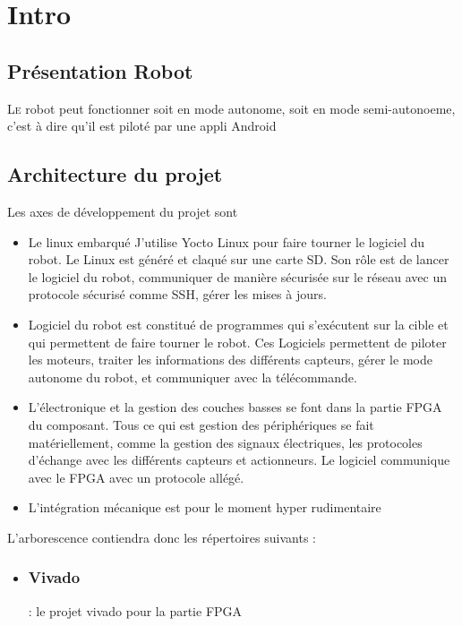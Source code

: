 
\chapter{Intro}

\section{Présentation Robot}
\lettrine[lines=1]{L}e robot peut fonctionner soit en mode autonome, soit en mode semi-autonoeme, c'est à dire qu'il est piloté par une appli Android




\section{Architecture du projet}

Les axes de développement du projet sont
\begin{itemize}
\item  Le linux embarqué
J'utilise Yocto Linux pour faire tourner le logiciel du robot. Le Linux est généré et claqué sur une carte SD.
Son rôle est de lancer le logiciel du robot, communiquer de manière sécurisée sur le réseau avec un protocole sécurisé comme SSH, gérer les mises à jours.

\item Logiciel du robot est constitué de programmes qui s'exécutent sur la cible et qui permettent de faire tourner le robot.
Ces Logiciels permettent de piloter les moteurs, traiter les informations des différents capteurs, gérer le mode autonome du robot, et communiquer avec la télécommande.
\item L'électronique et la gestion des couches basses se font dans la partie FPGA du composant.
Tous ce qui est gestion des périphériques se fait matériellement, comme la gestion des signaux électriques, les protocoles d'échange avec les différents capteurs et actionneurs.
Le logiciel communique avec le FPGA avec un protocole allégé.

\item L'intégration mécanique est pour le moment hyper rudimentaire

\end{itemize}




L'arborescence contiendra donc les répertoires suivants : 




\begin{itemize}


\item 


\subsection{Vivado}
  : le projet vivado pour la partie FPGA

\end{itemize}



 